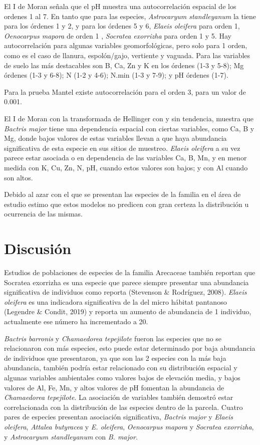 \documentclass[11pt,]{article}
\begin{document}
El I de Moran señala que el pH muestra una autocorrelación espacial de
los ordenes 1 al 7. En tanto que para las especies, \emph{Astrocaryum
standleyanum} la tiene para los órdenes 1 y 2, y para los órdenes 5 y 6,
\emph{Elaeis oleifera} para orden 1, \emph{Oenocarpus mapora} de orden 1
, \emph{Socratea exorrizha} para orden 1 y 5. Hay autocorrelación para
algunas variables geomorfológicas, pero solo para 1 orden, como es el
caso de llanura, espolón/gajo, vertiente y vaguada. Para las variables
de suelo las más destacables son B, Ca, Zn y K en los órdenes (1-3 y
5-8); Mg órdenes (1-3 y 6-8); N (1-2 y 4-6); N.min (1-3 y 7-9); y pH
órdenes (1-7).

Para la prueba Mantel existe autocorrelación para el orden 3, para un
valor de 0.001.

El I de Moran con la transformada de Hellinger con y sin tendencia,
muestra que \emph{Bactris major} tiene una dependencia espacial con
ciertas variables, como Ca, B y Mg, donde bajos valores de estas
variables llevan a que haya abundancia significativa de esta especie en
sus sitios de muestreo. \emph{Elaeis oleifera} a su vez parece estar
asociada o en dependencia de las variables Ca, B, Mn, y en menor medida
con K, Cu, Zn, N, pH, cuando estos valores son bajos; y con Al cuando
son altos.

Debido al azar con el que se presentan las especies de la familia en el
área de estudio estimo que estos modelos no predicen con gran certeza la
distribución u ocurrencia de las mismas.

\section{Discusión}\label{discusiuxf3n}

Estudios de poblaciones de especies de la familia Arecaceae también
reportan que Socratea exorrizha es una especie que parece siempre
presentar una abundancia significativa de individuos como reporta
(Stevenson \& Rodríguez, 2008). \emph{Elaeis oleifera} es una indicadora
significativa de la del micro hábitat pantanoso (Legendre \& Condit,
2019) y reporta un aumento de abundancia de 1 individuo, actualmente ese
número ha incrementado a 20.

\emph{Bactris barronis} y \emph{Chamaedorea tepejilote} fueron las
especies que no se relacionaron con más especies, esto puede estar
determinado por baja abundancia de individuos que presentaron, ya que
son las 2 especies con la más baja abundancia, también podría estar
relacionado con su distribución espacial y algunas variables ambientales
como valores bajos de elevación media, y bajos valores de Al, Fe, Mn, y
altos valores de pH fomentan la abundancia de \emph{Chamaedorea
tepejilote}. La asociación de variables también demostró estar
correlacionada con la distribución de las especies dentro de la parcela.
Cuatro pares de especies presentan asociación significativa,
\emph{Bactris major} y \emph{Elaeis oleifera}, \emph{Attalea butyracea}
y \emph{E. oleifera}, \emph{Oenocarpus mapora} y \emph{Socratea
exorrizha}, y \emph{Astrocaryum standleyanum} con \emph{B. major}.
\end{document}
